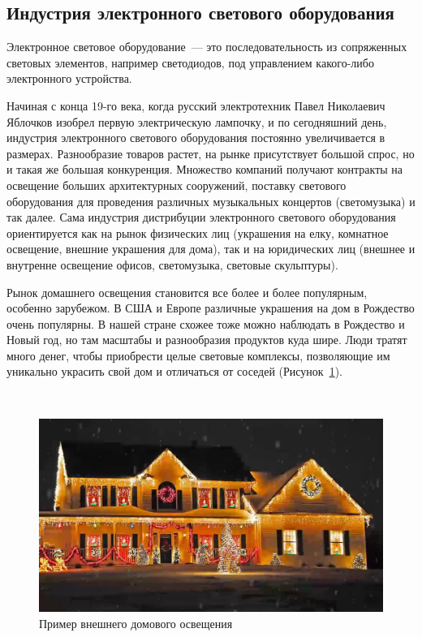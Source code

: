 \subsection{Индустрия электронного светового оборудования}
\label{sec:subject:industry}

Электронное световое оборудование~--- это последовательность из сопряженных световых элементов, например светодиодов, под управлением какого-либо электронного устройства.

Начиная с конца 19-го века, когда русский электротехник Павел Николаевич Яблочков изобрел первую электрическую лампочку, и по сегодняшний день, индустрия электронного светового оборудования постоянно увеличивается в размерах. Разнообразие товаров растет, на рынке присутствует большой спрос, но и такая же большая конкуренция. Множество компаний получают контракты на освещение больших архитектурных сооружений, поставку светового оборудования для проведения различных музыкальных концертов (светомузыка) и так далее. Сама индустрия дистрибуции электронного светового оборудования ориентируется как на рынок физических лиц (украшения на елку, комнатное освещение, внешние украшения для дома), так и на юридических лиц (внешнее и внутренне освещение офисов, светомузыка, световые скульптуры). 

Рынок домашнего освещения становится все более и более популярным, особенно зарубежом. В США и Европе различные украшения на дом в Рождество очень популярны. В нашей стране схожее тоже можно наблюдать в Рождество и Новый год, но там масштабы и разнообразия продуктов куда шире. Люди тратят много денег, чтобы приобрести целые световые комплексы, позволяющие им уникально украсить свой дом и отличаться от соседей (Рисунок~\ref{fig:subject:industry:example}).

~
\begin{figure}[H]
\centering
	\includegraphics[scale=0.35]{figures/home_lightings.jpg}
	\caption{Пример внешнего домового освещения}
	\label{fig:subject:industry:example}
\end{figure}

